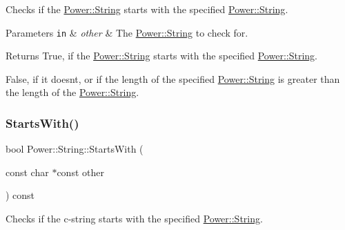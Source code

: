 Checks if the \hyperlink{class_power_1_1_string}{Power\+::\+String} starts with the specified \hyperlink{class_power_1_1_string}{Power\+::\+String}. 


\begin{DoxyParams}[1]{Parameters}
\mbox{\tt in}  & {\em other} & The \hyperlink{class_power_1_1_string}{Power\+::\+String} to check for. \\
\hline
\end{DoxyParams}
\begin{DoxyReturn}{Returns}
True, if the \hyperlink{class_power_1_1_string}{Power\+::\+String} starts with the specified \hyperlink{class_power_1_1_string}{Power\+::\+String}. 

False, if it doesn\textquotesingle{}t, or if the length of the specified \hyperlink{class_power_1_1_string}{Power\+::\+String} is greater than the length of the \hyperlink{class_power_1_1_string}{Power\+::\+String}. 
\end{DoxyReturn}
\mbox{\label{class_power_1_1_string_a97d52a90799b590cfed6f3ce9d2204fc}} 
\subsubsection{\texorpdfstring{Starts\+With()}{StartsWith()}\hspace{0.1cm}{\footnotesize\ttfamily [2/4]}}
{\footnotesize\ttfamily bool Power\+::\+String\+::\+Starts\+With (\begin{DoxyParamCaption}\item[{const char $\ast$const}]{other }\end{DoxyParamCaption}) const\hspace{0.3cm}{\ttfamily [inline]}}



Checks if the c-\/string starts with the specified \hyperlink{class_power_1_1_string}{Power\+::\+String}. 


